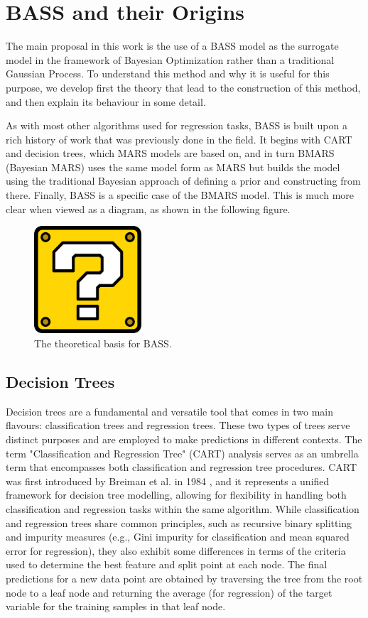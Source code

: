 \chapter{BASS and their Origins}

The main proposal in this work is the use of a BASS model as the surrogate model in the framework of Bayesian Optimization rather than a traditional Gaussian Process. To understand this method and why it is useful for this purpose, we develop first the theory that lead to the construction of this method, and then explain its behaviour in some detail. 

As with most other algorithms used for regression tasks, BASS is built upon a rich history of work that was previously done in the field. It begins with CART and decision trees, which MARS models are based on, and in turn BMARS (Bayesian MARS) uses the same model form as MARS but builds the model using the traditional Bayesian approach of defining a prior and constructing from there. Finally, BASS is a specific case of the BMARS model. This is much more clear when viewed as a diagram, as shown in the following figure. 

\begin{figure}[h]
	\includegraphics[width=4cm]{Figures/missing.png}
	\centering
	\caption{The theoretical basis for BASS.}
	\label{building_BASS}
\end{figure}

\section{Decision Trees}

Decision trees are a fundamental and versatile tool that comes in two main flavours: classification trees and regression trees. These two types of trees serve distinct purposes and are employed to make predictions in different contexts. The term "Classification and Regression Tree" (CART) analysis serves as an umbrella term that encompasses both classification and regression tree procedures. CART was first introduced by Breiman et al. in 1984 \cite{breiman2017classification}, and it represents a unified framework for decision tree modelling, allowing for flexibility in handling both classification and regression tasks within the same algorithm. While classification and regression trees share common principles, such as recursive binary splitting and impurity measures (e.g., Gini impurity for classification and mean squared error for regression), they also exhibit some differences in terms of the criteria used to determine the best feature and split point at each node. The final predictions for a new data point are obtained by traversing the tree from the root node to a leaf node and returning the average (for regression) of the target variable for the training samples in that leaf node.

